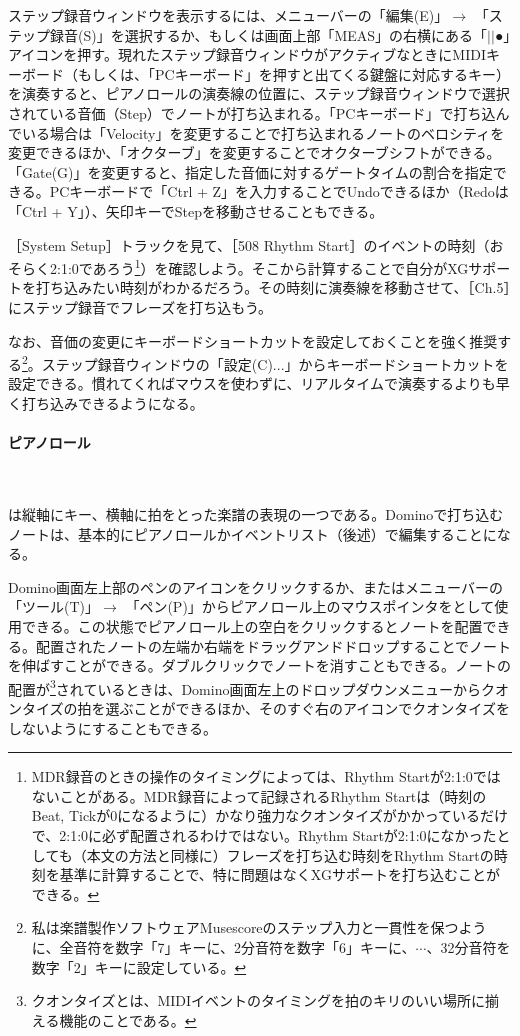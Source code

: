 \documentclass[uplatex, 10pt, dvipdfmx]{jsarticle}
\numberwithin{equation}{section}
\newcommand{\emphj}[1]{\textbf{\textrm{\textgt{{#1}}}}}
\begin{document}
ステップ録音ウィンドウを表示するには、メニューバーの「編集(E)」$\rightarrow$ 「ステップ録音(S)」を選択するか、もしくは画面上部「MEAS」の右横にある「$\vert\vert$●」アイコンを押す。現れたステップ録音ウィンドウがアクティブなときにMIDIキーボード（もしくは、「PCキーボード」を押すと出てくる鍵盤に対応するキー）を演奏すると、ピアノロールの演奏線の位置に、ステップ録音ウィンドウで選択されている音価（Step）でノートが打ち込まれる。「PCキーボード」で打ち込んでいる場合は「Velocity」を変更することで打ち込まれるノートのベロシティを変更できるほか、「オクターブ」を変更することでオクターブシフトができる。「Gate(G)」を変更すると、指定した音価に対するゲートタイムの割合を指定できる。PCキーボードで「Ctrl + Z」を入力することでUndoできるほか（Redoは「Ctrl + Y」）、矢印キーでStepを移動させることもできる。

［System Setup］トラックを見て、［508 Rhythm Start］のイベントの時刻（おそらく2:1:0であろう\footnote{MDR録音のときの操作のタイミングによっては、Rhythm Startが2:1:0ではないことがある。MDR録音によって記録されるRhythm Startは（時刻のBeat, Tickが0になるように）かなり強力なクオンタイズがかかっているだけで、2:1:0に必ず配置されるわけではない。Rhythm Startが2:1:0になかったとしても（本文の方法と同様に）フレーズを打ち込む時刻をRhythm Startの時刻を基準に計算することで、特に問題はなくXGサポートを打ち込むことができる。}）を確認しよう。そこから計算することで自分がXGサポートを打ち込みたい時刻がわかるだろう。その時刻に演奏線を移動させて、［Ch.5］にステップ録音でフレーズを打ち込もう。

なお、音価の変更にキーボードショートカットを設定しておくことを強く推奨する\footnote{私は楽譜製作ソフトウェアMusescoreのステップ入力と一貫性を保つように、全音符を数字「7」キーに、2分音符を数字「6」キーに、$\cdots$、32分音符を数字「2」キーに設定している。}。ステップ録音ウィンドウの「設定(C)...」からキーボードショートカットを設定できる。慣れてくればマウスを使わずに、リアルタイムで演奏するよりも早く打ち込みできるようになる。

\paragraph{ピアノロール} \

\emphj{ピアノロール}は縦軸にキー、横軸に拍をとった楽譜の表現の一つである。Dominoで打ち込むノートは、基本的にピアノロールかイベントリスト（後述）で編集することになる。

Domino画面左上部のペンのアイコンをクリックするか、またはメニューバーの「ツール(T)」$\rightarrow$ 「ペン(P)」からピアノロール上のマウスポインタを\emphj{ペンツール}として使用できる。この状態でピアノロール上の空白をクリックするとノートを配置できる。配置されたノートの左端か右端をドラッグアンドドロップすることでノートを伸ばすことができる。ダブルクリックでノートを消すこともできる。ノートの配置が\emphj{クオンタイズ}\footnote{クオンタイズとは、MIDIイベントのタイミングを拍のキリのいい場所に揃える機能のことである。}されているときは、Domino画面左上のドロップダウンメニューからクオンタイズの拍を選ぶことができるほか、そのすぐ右のアイコンでクオンタイズをしないようにすることもできる。
\end{document}
